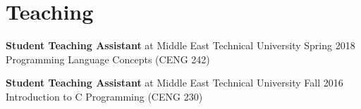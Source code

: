 
\section{Teaching}

\begin{denseouterlist}

\entrymid
{\textbf{Student Teaching Assistant} at Middle East Technical University}
{Spring 2018}
{Programming Language Concepts (CENG 242)}

\entrymid
{\textbf{Student Teaching Assistant} at Middle East Technical University}
{Fall 2016}
{Introduction to C Programming (CENG 230)}

\end{denseouterlist}
